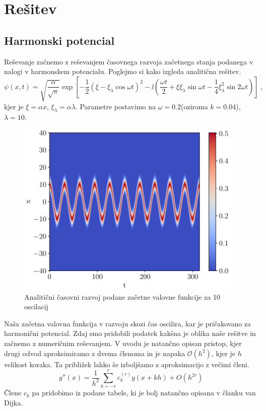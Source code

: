 \documentclass{article}
\begin{document}
\section{Rešitev}
\subsection{Harmonski potencial}
Reševanje začnemo z reševanjem časovnega razvoja začetnega stanja podanega v nalogi v harmonskem potencialu. Poglejmo si kako izgleda analitična rešitev. 
\begin{equation*}
  \psi(x,t)=\sqrt{\frac{\alpha}{\sqrt{\pi}}} \exp\left[-\frac12 \left(\xi-\xi_\lambda \cos\omega t\right)^2 - \ii \left(\frac{\omega t}{2}+\xi\xi_\lambda \sin\omega t - \frac14 \xi_\lambda^2 \sin 2 \omega t\right)\right]\>,
\end{equation*}
kjer je $\xi=\alpha x$, $\xi_\lambda=\alpha \lambda$. Parametre postavimo na $\omega=0.2$(oziroma $k=0.04$), $\lambda=10$. 
\begin{figure}[H]
	\centering
	\includegraphics[width=0.7\linewidth]{anal.pdf}
	\caption{Analitični časovni razvoj podane začetne valovne funkcije za 10 oscilacij}
\end{figure}
Naša začetna valovna funkcija v razvoju skozi čas oscilira, kar je pričakovano za harmonični potencial. Zdaj smo pridobili podatek kakšna je oblika naše rešitve in začnemo z numeričnim reševanjem. V uvodu je natančno opisan pristop, kjer drugi odvod aproksimiramo z dvema členoma in je napaka $\mathscr{O}(h^2)$, kjer je $h$ velikost koraka. Ta približek lahko še izboljšamo z aproksimacijo z večimi členi.
\begin{equation}
y''(x) = \frac{1}{h^2} \sum_{k=-r}^r c_k^{(r)} y(x + kh) + O(h^{2r})
\end{equation}
Člene $c_k$ pa pridobimo iz podane tabele, ki je bolj natančno opisana v članku van Dijka.
\end{document}
